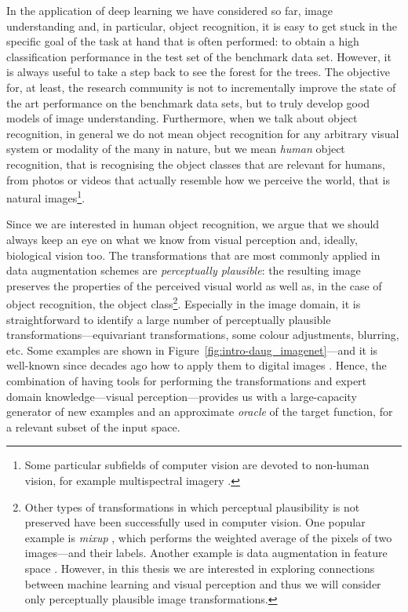 {In the application of deep learning we have considered so far, image understanding and, in particular, object recognition, it is easy to get stuck in the specific goal of the task at hand that is often performed: to obtain a high classification performance in the test set of the benchmark data set. However, it is always useful to take a step back to see the forest for the trees. The objective for, at least, the research community is not to incrementally improve the state of the art performance on the benchmark data sets, but to truly develop good models of image understanding. Furthermore, when we talk about object recognition, in general we do not mean object recognition for any arbitrary visual system or modality of the many in nature, but we mean \textit{human} object recognition, that is recognising the object classes that are relevant for humans, from photos or videos that actually resemble how we perceive the world, that is natural images\footnote{Some particular subfields of computer vision are devoted to non-human vision, for example multispectral imagery \citep{audebert2019multispectral}.}.

Since we are interested in human object recognition, we argue that we should always keep an eye on what we know from visual perception and, ideally, biological vision too. The transformations that are most commonly applied in data augmentation schemes are \textit{perceptually plausible}: the resulting image preserves the properties of the perceived visual world as well as, in the case of object recognition, the object class\footnote{Other types of transformations in which perceptual plausibility is not preserved have been successfully used in computer vision. One popular example is \textit{mixup} \citep{zhang2017mixup}, which performs the weighted average of the pixels of two images---and their labels. Another example is data augmentation in feature space \citep{devries2017daugfeatspace}. However, in this thesis we are interested in exploring connections between machine learning and visual perception and thus we will consider only perceptually plausible image transformations.}. Especially in the image domain, it is straightforward to identify a large number of perceptually plausible transformations---equivariant transformations, some colour adjustments, blurring, etc. Some examples are shown in Figure~\ref{fig:intro-daug_imagenet}---and it is well-known since decades ago how to apply them to digital images \citep{gonzalez2018imageprocessing}. Hence, the combination of having tools for performing the transformations and expert domain knowledge---visual perception---provides us with a large-capacity generator of new examples and an approximate \textit{oracle} of the target function, for a relevant subset of the input space. 

}
